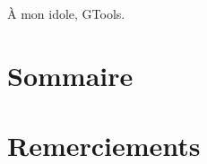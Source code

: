 \documentclass[titlepage,twoside,letterpaper,openright,12pt]{book} %
\def\DATE{\color{red}DATE DU DEPOT FINAL\color{black}}
\begin{document}

\frontmatter









\newpage
\vglue 5cm
\begin{flushright}
À mon idole, GTools.
\end{flushright}


\newpage
\onehalfspacing
{}\chapter*{Sommaire}



\chapter{Remerciements}
\end{document}
